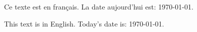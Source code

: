 \documentclass{scrartcl}
\begin{document}
Ce texte est en fran\c{c}ais. La date aujourd'hui est: \today.

This text is in English. Today's date is: \today.
\end{document}
